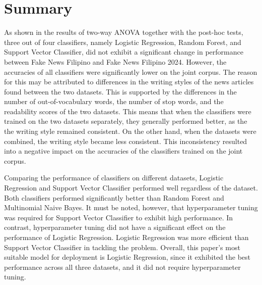 \section{Summary} \label{dataset-limitation}

As shown in the results of two-way ANOVA together with the post-hoc tests, three out of four classifiers, namely Logistic Regression, Random Forest, and Support Vector Classifier, did not exhibit a significant change in performance between Fake News Filipino and Fake News Filipino 2024. However, the accuracies of all classifiers were significantly lower on the joint corpus. The reason for this may be attributed to differences in the writing styles of the news articles found between the two datasets. This is supported by the differences in the number of out-of-vocabulary words, the number of stop words, and the readability scores of the two datasets. This means that when the classifiers were trained on the two datasets separately, they generally performed better, as the the writing style remained consistent. On the other hand, when the datasets were combined, the writing style became less consistent. This inconsistency resulted into a negative impact on the accuracies of the classifiers trained on the joint corpus.

Comparing the performance of classifiers on different datasets, Logistic Regression and Support Vector Classifier performed well regardless of the dataset. Both classifiers performed significantly better than Random Forest and Multinomial Naive Bayes. It must be noted, however, that hyperparameter tuning was required for Support Vector Classifier to exhibit high performance. In contrast, hyperparameter tuning did not have a significant effect on the performance of Logistic Regression. Logistic Regression was more efficient than Support Vector Classifier in tackling the problem. Overall, this paper's most suitable model for deployment is Logistic Regression, since it exhibited the best performance across all three datasets, and it did not require hyperparameter tuning.

\pagebreak
